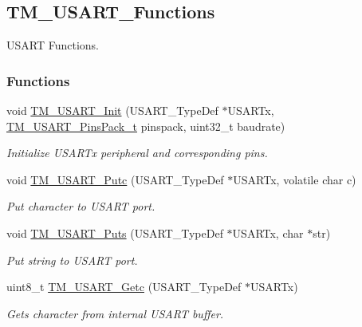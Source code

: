 \hypertarget{group___t_m___u_s_a_r_t___functions}{}\subsection{T\+M\+\_\+\+U\+S\+A\+R\+T\+\_\+\+Functions}
\label{group___t_m___u_s_a_r_t___functions}


U\+S\+A\+R\+T Functions.  


\subsubsection*{Functions}
\begin{DoxyCompactItemize}
\item 
void \hyperlink{group___t_m___u_s_a_r_t___functions_ga70bed9fb6612cb572a8c10e148404344}{T\+M\+\_\+\+U\+S\+A\+R\+T\+\_\+\+Init} (U\+S\+A\+R\+T\+\_\+\+Type\+Def $\ast$U\+S\+A\+R\+Tx, \hyperlink{group___t_m___u_s_a_r_t___typedefs_gafa8a506eb27c93db067bb06039ae210f}{T\+M\+\_\+\+U\+S\+A\+R\+T\+\_\+\+Pins\+Pack\+\_\+t} pinspack, uint32\+\_\+t baudrate)
\begin{DoxyCompactList}\small\item\em Initialize U\+S\+A\+R\+Tx peripheral and corresponding pins. \end{DoxyCompactList}\item 
void \hyperlink{group___t_m___u_s_a_r_t___functions_gadea35f4eaffbeb65ac900fe32710aeb8}{T\+M\+\_\+\+U\+S\+A\+R\+T\+\_\+\+Putc} (U\+S\+A\+R\+T\+\_\+\+Type\+Def $\ast$U\+S\+A\+R\+Tx, volatile char c)
\begin{DoxyCompactList}\small\item\em Put character to U\+S\+A\+R\+T port. \end{DoxyCompactList}\item 
void \hyperlink{group___t_m___u_s_a_r_t___functions_ga453aeaa886278333403ff4937c01dcf3}{T\+M\+\_\+\+U\+S\+A\+R\+T\+\_\+\+Puts} (U\+S\+A\+R\+T\+\_\+\+Type\+Def $\ast$U\+S\+A\+R\+Tx, char $\ast$str)
\begin{DoxyCompactList}\small\item\em Put string to U\+S\+A\+R\+T port. \end{DoxyCompactList}\item 
uint8\+\_\+t \hyperlink{group___t_m___u_s_a_r_t___functions_ga340391d061340e4635b4bbafea23602b}{T\+M\+\_\+\+U\+S\+A\+R\+T\+\_\+\+Getc} (U\+S\+A\+R\+T\+\_\+\+Type\+Def $\ast$U\+S\+A\+R\+Tx)
\begin{DoxyCompactList}\small\item\em Gets character from internal U\+S\+A\+R\+T buffer. \end{DoxyCompactList}\item 

\end{DoxyCompactItemize}
